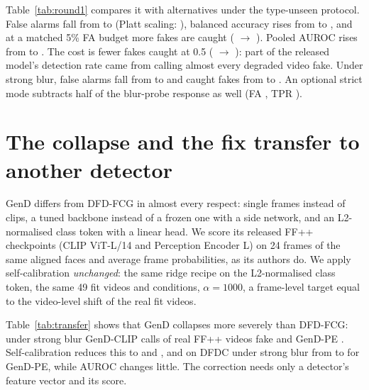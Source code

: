 \documentclass[11pt]{article}
\begin{document}
Table~\ref{tab:round1} compares it with alternatives under the type-unseen protocol. False alarms fall from \OrigFA{}
to \SCFA{} (Platt scaling: \PlattFA{}), balanced accuracy rises from \OrigBacc{} to \SCBacc{}, and at a matched 5\% FA
budget more fakes are caught (\OrigTprFive{} $\rightarrow$ \SCTprFive{}). Pooled AUROC rises from \OrigPooled{} to
\SCPooled{}. The cost is fewer fakes caught at 0.5 (\OrigTPR{} $\rightarrow$ \SCTPR{}): part of the released model's
detection rate came from calling almost every degraded video fake. Under strong blur, false alarms fall from
\OrigFAGBFive{} to \SCFAGBFive{} and caught fakes from \OrigTPRGBFive{} to \SCTPRGBFive{}. An optional strict mode subtracts half
of the blur-probe response as well (FA \StrictFA{}, TPR \StrictTPR{}).

\begin{table}[t]
  \centering\small
  \caption{FF++ test split, 13 degraded conditions, tested degradation type withheld from fitting. FA: real videos
  called fake. Pooled AUROC ranks all conditions together (seen-type protocol).}
  \label{tab:round1}
  \resizebox{\linewidth}{!}{\TabRoundOne}
\end{table}

\section{The collapse and the fix transfer to another detector}
\label{sec:transfer}
GenD \cite{yermakov2026gend} differs from DFD-FCG in almost every respect: single frames instead of clips, a tuned
backbone instead of a frozen one with a side network, and an L2-normalised class token with a linear head. We score
its released FF++ checkpoints (CLIP ViT-L/14 and Perception Encoder L) on 24 frames of the same aligned faces and
average frame probabilities, as its authors do. We apply self-calibration \emph{unchanged}: the same ridge recipe on the
L2-normalised class token, the same 49 fit videos and conditions, $\alpha=1000$, a frame-level target equal to the
video-level shift of the real fit videos.

Table~\ref{tab:transfer} shows that GenD collapses more severely than DFD-FCG: under strong blur GenD-CLIP calls
\ClipRawFAFfppGBFive{} of real FF++ videos fake and GenD-PE \PeRawFAFfppGBFive{}. Self-calibration reduces this to
\ClipCalFAFfppGBFive{} and \PeCalFAFfppGBFive{}, and on DFDC under strong blur from \PeRawFADfdcGBFive{} to \PeCalFADfdcGBFive{}
for GenD-PE, while AUROC changes little. The correction needs only a detector's feature vector and its score.
\end{document}
